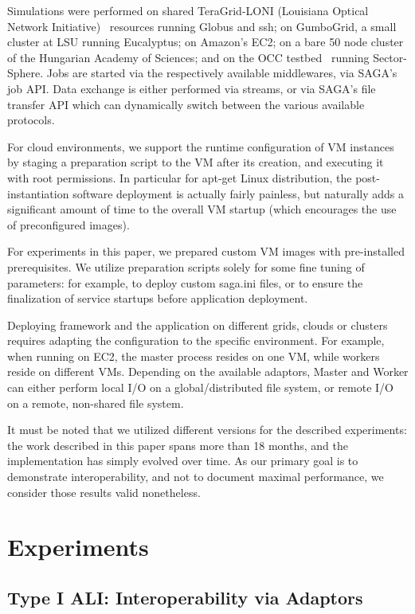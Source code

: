 \documentclass[3p,twocolumn]{elsarticle}
\begin{document}
Simulations were performed on shared TeraGrid-LONI (Louisiana Optical
Network Initiative)~\cite{loni-url} resources running Globus and ssh;
on GumboGrid, a small cluster at LSU running Eucalyptus; on Amazon's
EC2; on a bare 50 node cluster of the Hungarian Academy of Sciences;
and on the OCC testbed~\cite{occ_testbed} running Sector-Sphere.  Jobs
are started via the respectively available middlewares, via SAGA's job
API.  Data exchange is either performed via streams, or via SAGA's
file transfer API which can dynamically switch between the various
available protocols.

For cloud environments, we support the runtime configuration of VM
instances by staging a preparation script to the VM after its
creation, and executing it with root permissions.  In particular for
apt-get Linux distribution, the post-instantiation software deployment
is actually fairly painless, but naturally adds a significant amount
of time to the overall VM startup (which encourages the use of
preconfigured images).

For experiments in this paper, we prepared custom VM images with
pre-installed prerequisites.  We utilize preparation scripts solely
for some fine tuning of parameters: for example, to deploy custom
saga.ini files, or to ensure the finalization of service startups
before application deployment.

Deploying \sagamapreduce framework and the \wc application on
different grids, clouds or clusters requires adapting the configuration
to the specific environment.  For example, when running \sagamapreduce
on EC2, the master process resides on one VM, while workers reside on
different VMs.  Depending on the available adaptors, Master and Worker
can either perform local I/O on a global/distributed file system, or
remote I/O on a remote, non-shared file system.

It must be noted that we utilized different \smr versions for the
described experiments: the work described in this paper spans more
than 18 months, and the \smr implementation has simply evolved over
time.  As our primary goal is to demonstrate interoperability, and not
to document maximal performance, we consider those results valid
nonetheless.


\section{Experiments} 
\label{sec:exp}

\subsection{Type I ALI: Interoperability via Adaptors}
\end{document}
